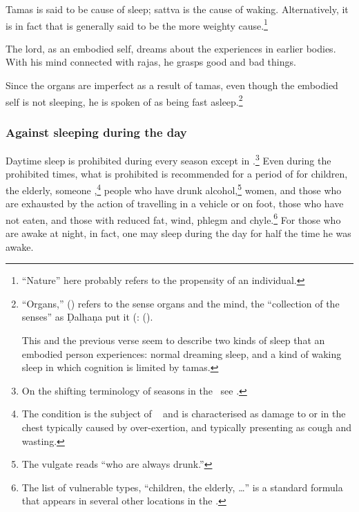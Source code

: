 \begin{translation}
\item[35]

\begin{sloka}
Tamas is said to be cause of sleep; sattva is the cause of waking.
Alternatively, it is in fact  that is generally
said to be the more weighty cause.\footnote{ “Nature” here probably
    refers to the propensity of an individual.}
\end{sloka}

\item[36]

\begin{sloka}
The lord, as an embodied self, dreams about the experiences in earlier
bodies.  With his mind connected with rajas, he grasps good and bad
things.
\end{sloka}

\item[37]

 \begin{sloka}
Since the organs are imperfect as a result of tamas, even though
the embodied self is not sleeping, he is spoken of as being fast
asleep.\footnote{“Organs,” () refers to the sense organs
    and the mind, the “{collection of the senses}” as Ḍalhaṇa put it
    (:  (). 
    
    This and the previous verse seem to describe two kinds of sleep
that an embodied person experiences: normal dreaming sleep, and a
kind of waking sleep in which cognition is limited by tamas.}
 \end{sloka}

\subsubsection{Against sleeping during the day}

\item[38]

Daytime sleep is prohibited during every season except in
.\footnote{On the shifting terminology of seasons
    in the \SS\ see \cite{ange-2022}.} Even during the prohibited times,
    what is prohibited is recommended for a period of  for children, the elderly, someone
    ,\footnote{\label{angamarda}The
        condition is the subject of \CS\  and is
        characterised as damage to or in the chest typically caused by
        over-exertion, and typically presenting as cough and wasting.} people
        who have drunk alcohol,\footnote{The vulgate reads “who are always
            drunk.”} women, and those who are exhausted by the action of
            travelling in a vehicle or on foot, those who have not eaten, and
            those with reduced fat, wind, phlegm and chyle.\footnote{The list of
                vulnerable types, “children, the elderly, \ldots” is a standard
                formula that appears in several other locations in the \SS.} %
                For those who are awake at night, in fact, one may
                sleep during the day for half the time he was awake.


\end{translation}
